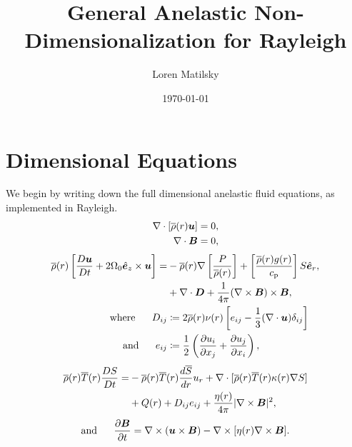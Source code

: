 \documentclass[12pt]{article}
\date{\today}
\author{Loren Matilsky}
\title{General Anelastic Non-Dimensionalization for Rayleigh}
\numberwithin{equation}{section}
\begin{document}
	\maketitle
	\section{Dimensional Equations}
	We begin by writing down the full dimensional anelastic fluid equations, as implemented in Rayleigh.
	\begin{align}
		\nabla\cdot[\overline{\rho}(r)\bm{u}] &= 0\label{eq:contdim},\\
		\nabla\cdot \bm{B} &= 0,
	\end{align}
	\begin{subequations}\label{eq:momdim}
	\begin{align}
		\overline{\rho}(r)\left[\frac{D\bm{u}}{Dt}+2\Omega_0\hat{\bm{e}}_z\times\bm{u}\right] = &-\overline{\rho}(r)\nabla\left[ \frac{P}{\overline{\rho}(r)} \right] + \left[\frac{\overline{\rho}(r) g(r)}{c_{\rm{p}}}\right] S\hat{\bm{e}}_r, \nonumber\\
		&+\nabla\cdot\bm{D} + \frac{1}{4\pi}(\nabla\times\bm{B})\times\bm{B},\\
		\text{where}\ \ \ \ \  D_{ij} &\coloneqq 2\overline{\rho}(r)\nu(r) \left[e_{ij} - \frac{1}{3}(\nabla\cdot\bm{u}) \delta_{ij} \right]\\
		\text{and}\ \ \ \ \  e_{ij} &\coloneqq \frac{1}{2}\left(\frac{\partial u_i}{\partial x_j} + \frac{\partial u_j}{\partial x_i} \right),
	\end{align}
	\end{subequations}
	\begin{align}\label{eq:endim}
		\overline{\rho}(r)\overline{T}(r) \frac{DS}{Dt} = &- \overline{\rho}(r)\overline{T}(r) \frac{d\overline{S}}{dr} u_r + \nabla\cdot[\overline{\rho}(r) \overline{T}(r) \kappa(r) \nabla S] \nonumber \\
		&+ Q(r) + D_{ij}e_{ij} + \frac{\eta(r)}{4\pi}|\nabla\times\bm{B}|^2,
	\end{align}
	\begin{align}\label{eq:inddim}
	\text{and}\ \ \ \ \  \frac{\partial\bm{B}}{\partial t} = \nabla\times(\bm{u}\times\bm{B}) - \nabla\times[\eta(r)\nabla\times\bm{B}].
	\end{align}
\end{document}
